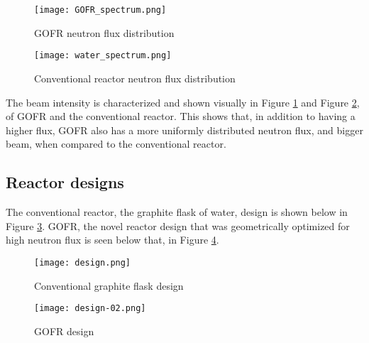 \begin{figure}[!htbp]
\centering
\texttt{[image: GOFR\_spectrum.png]}
\caption{GOFR neutron flux distribution}
\label{fig:GOFR-spec}
\end{figure}

\begin{figure}[!htbp]
\centering
\texttt{[image: water\_spectrum.png]}
\caption{Conventional reactor neutron flux distribution}
\label{fig:water-spec}
\end{figure}

The beam intensity is characterized and shown visually in Figure \ref{fig:GOFR-spec} and Figure \ref{fig:water-spec}, of GOFR and the conventional reactor. This shows that, in addition to having a higher flux, GOFR also has a more uniformly distributed neutron flux, and bigger beam, when compared to the conventional reactor.

\subsection{Reactor designs}
The conventional reactor, the graphite flask of water, design is shown below in Figure \ref{fig:design1}. GOFR, the novel reactor design that was geometrically optimized for high neutron flux is seen below that, in Figure \ref{fig:design2}.

\begin{figure}[!htbp]
\centering
\texttt{[image: design.png]}
\caption{Conventional graphite flask design}
\label{fig:design1}
\end{figure}

\begin{figure}[!htbp]
\centering
\texttt{[image: design-02.png]}
\caption{GOFR design}
\label{fig:design2}
\end{figure}
